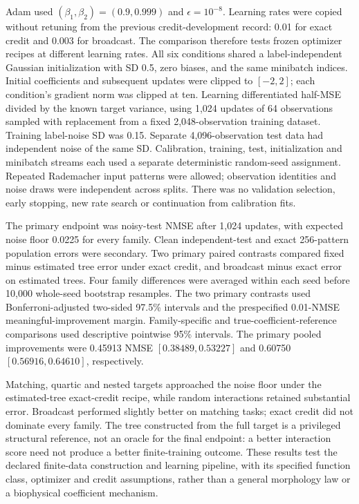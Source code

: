 Adam used $(\beta_1,\beta_2)=(0.9,0.999)$ and $\epsilon=10^{-8}$. Learning
rates were copied without retuning from the previous credit-development
record: 0.01 for exact credit and 0.003 for broadcast. The comparison therefore tests frozen optimizer recipes at different
learning rates. All six conditions
shared a label-independent Gaussian initialization with SD 0.5, zero biases,
and the same minibatch indices. Initial coefficients and subsequent updates
were clipped to $[-2,2]$; each condition's gradient norm was clipped at ten.
Learning differentiated half-MSE divided by the known target variance,
using 1,024 updates of 64 observations sampled with replacement from a fixed
2,048-observation training dataset. Training label-noise SD was 0.15.
Separate 4,096-observation test data had independent noise of the same SD.
Calibration, training, test, initialization and minibatch streams each used
a separate deterministic random-seed assignment. Repeated Rademacher input patterns were
allowed; observation identities and noise draws were independent across
splits. There was no validation selection, early stopping, new rate search
or continuation from calibration fits.

The primary endpoint was noisy-test NMSE after 1,024 updates, with expected
noise floor 0.0225 for every family. Clean independent-test and exact
256-pattern population errors were secondary. Two primary paired contrasts
compared fixed minus estimated tree error under exact credit, and broadcast
minus exact error on estimated trees. Four family differences were averaged
within each seed before 10,000 whole-seed bootstrap resamples. The two primary
contrasts used Bonferroni-adjusted two-sided 97.5\% intervals and the
prespecified 0.01-NMSE meaningful-improvement margin. Family-specific and
true-coefficient-reference comparisons used descriptive pointwise 95\%
intervals. The primary pooled improvements were 0.45913 NMSE
$[0.38489,0.53227]$ and 0.60750 $[0.56916,0.64610]$, respectively.

Matching, quartic and nested targets approached the noise floor under the
estimated-tree exact-credit recipe, while random interactions retained
substantial error. Broadcast performed slightly better on matching tasks;
exact credit did not dominate every family. The tree constructed from the full target is a privileged structural
reference, not an oracle for the final endpoint: a better interaction score
need not produce a better finite-training outcome. These results test the declared finite-data
construction and learning pipeline, with its specified function class,
optimizer and credit assumptions, rather than a general morphology law or a
biophysical coefficient mechanism.

